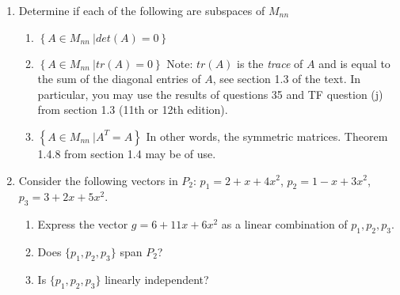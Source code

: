 \documentclass[12pt]{article}
\newcommand{\DS} [1] {${\displaystyle #1}$}
\begin{document}
\begin{enumerate}
        \item
              Determine if each of the following are subspaces of $M_{nn}$
              \begin{enumerate}
                      \item \DS{ \left\{A \in M_{nn} \ | det(A) = 0 \right\}}
                      \item \DS{ \left\{A \in M_{nn} \ | tr(A) = 0 \right\}} Note: $tr(A)$ is the \emph{trace} of $A$ and is equal to the sum of the diagonal entries of $A$, see section 1.3 of the text. In particular, you may use the results of questions 35 and TF question (j) from section 1.3 (11th or 12th edition).
                      \item \DS{ \left\{A \in M_{nn} \ | A^T = A \right\}} In other words, the symmetric matrices. Theorem 1.4.8 from section 1.4 may be of use.
              \end{enumerate}

        \item Consider the following vectors in $P_2$: $p_1 = 2 + x + 4x^2$, $p_2 = 1 - x + 3x^2$, $p_3 = 3 + 2x + 5x^2$.
              \begin{enumerate}
                      \item Express the vector $g = 6 + 11x + 6x^2$ as a linear combination of $p_1,p_2,p_3$.
                      \item Does $\{p_1,p_2,p_3\}$ span $P_2$?
                      \item Is $\{p_1,p_2,p_3\}$ linearly independent?
              \end{enumerate}




\end{enumerate}
\end{document}
